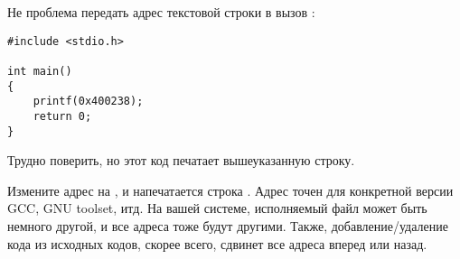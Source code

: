 Не проблема передать адрес текстовой строки  в вызов :

\begin{lstlisting}[style=customc]
#include <stdio.h>

int main()
{
    printf(0x400238);
    return 0;
}
\end{lstlisting}

Трудно поверить, но этот код печатает вышеуказанную строку.

Измените адрес на , и напечатается строка .
Адрес точен для конкретной версии GCC, GNU toolset, итд.
На вашей системе, исполняемый файл может быть немного другой, и все адреса тоже будут другими.
Также, добавление/удаление кода из исходных кодов, скорее всего, сдвинет все адреса вперед или назад.

